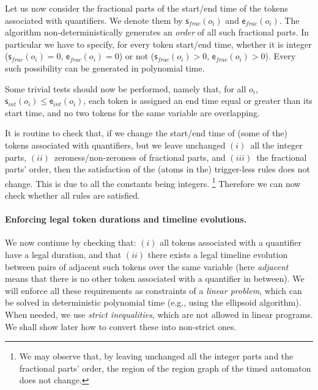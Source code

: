 Let us now consider the fractional parts of the start/end time of the tokens associated with quantifiers. We denote them by $\mathsf{s}_{frac}(o_i)$ and $\mathsf{e}_{frac}(o_i)$. The algorithm non-deterministically generates an \emph{order} of all such fractional parts. In particular we have to specify, for every token start/end time, whether it is integer ($\mathsf{s}_{frac}(o_i)=0$, $\mathsf{e}_{frac}(o_i)=0$) or not ($\mathsf{s}_{frac}(o_i)>0$, $\mathsf{e}_{frac}(o_i)>0$).
Every such possibility can be generated in polynomial time.

Some trivial tests should now be performed, namely that, for all $o_i$, $\mathsf{s}_{int}(o_i)\leq \mathsf{e}_{int}(o_i)$, each token is assigned an end time equal or greater than its start time, and no two tokens for the same variable are overlapping.

It is routine to check that, if we change the start/end time of (some of the) tokens associated with quantifiers, 
but we leave unchanged $(i)$~all the integer parts, $(ii)$~zeroness/non-zeroness of fractional parts, and $(iii)$~the fractional parts' order,
then the satisfaction of the (atoms in the) trigger-less rules does not change. This is due to all the constants being integers.%
\footnote{We may observe that, by leaving unchanged all the integer parts and the fractional parts' order, the region of the region graph of the timed automaton does not change.} Therefore we can now check whether all rules are satisfied.

\paragraph{Enforcing legal token durations and timeline evolutions.}

We now continue by checking that: $(i)$ all tokens associated with a quantifier have a legal duration, and that $(ii)$ there exists a legal timeline evolution between pairs of adjacent such tokens over the same variable (here \emph{adjacent} means that there is no other token associated with a quantifier in between). 
We will enforce all these requirements as constraints of a \emph{linear problem}, which can be solved in deterministic polynomial time (e.g., using the ellipsoid algorithm).
When needed, we use \emph{strict inequalities}, which are not allowed in linear programs. We shall show later how to convert these into non-strict ones.

